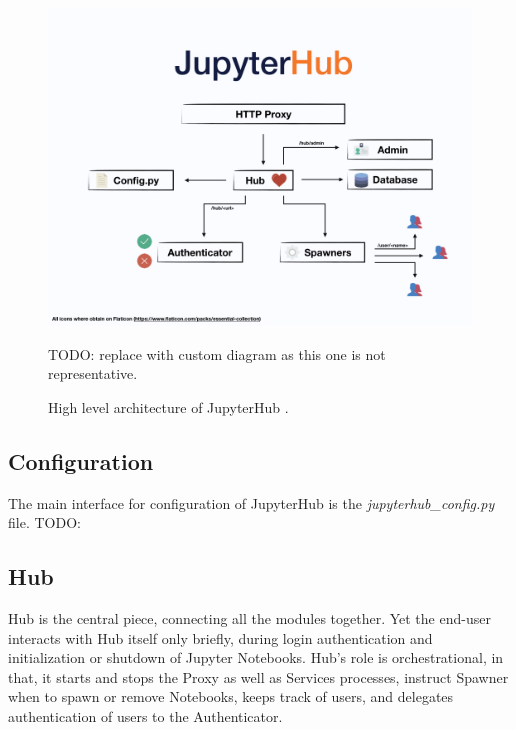 \documentclass[
  digital,     %
  oneside,     %
  nosansbold,  %
  nocolorbold, %
  lof,         %
  lot,         %
]{fithesis4}
\begin{document}
\begin{figure}[H]
  \begin{center}
  \includegraphics[width=\textwidth]{figures/jupyer-hub-architecture.jpeg}
  \end{center}
  \caption{High level architecture of JupyterHub \cite{jupyterhub}.} TODO: replace with custom diagram as this one is not representative.
  \label{fig:jupyter-hub-arch}
\end{figure}


\subsection{Configuration}
The main interface for configuration of JupyterHub is the \emph{jupyterhub\_config.py} file. 
TODO: 

\subsection{Hub}
Hub is the central piece, connecting all the modules together. Yet the end-user interacts with Hub itself only briefly, during login authentication and initialization or shutdown of Jupyter Notebooks. Hub's role is orchestrational, in that, it starts and stops the Proxy as well as Services processes, instruct Spawner when to spawn or remove Notebooks, keeps track of users, and delegates authentication of users to the Authenticator.
\end{document}
